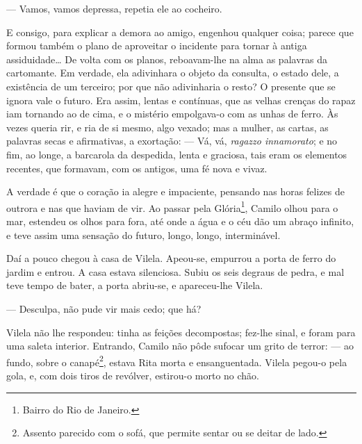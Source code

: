 --- Vamos, vamos depressa, repetia ele ao cocheiro.

E consigo, para explicar a demora ao amigo, engenhou qualquer coisa;
parece que formou também o plano de aproveitar o incidente para tornar à
antiga assiduidade\ldots{} De volta com os planos, reboavam-lhe na alma
as palavras da cartomante. Em verdade, ela adivinhara o objeto da
consulta, o estado dele, a existência de um terceiro; por que não
adivinharia o resto? O presente que se ignora vale o futuro. Era assim,
lentas e contínuas, que as velhas crenças do rapaz iam tornando ao de
cima, e o mistério empolgava-o com as unhas de ferro. Às vezes queria
rir, e ria de si mesmo, algo vexado; mas a mulher, as cartas, as
palavras secas e afirmativas, a exortação: --- Vá, vá, \emph{ragazzo
innamorato}; e no fim, ao longe, a barcarola da despedida, lenta e
graciosa, tais eram os elementos recentes, que formavam, com os antigos,
uma fé nova e vivaz.

A verdade é que o coração ia alegre e impaciente, pensando nas horas
felizes de outrora e nas que haviam de vir. Ao passar pela
Glória\footnote{Bairro do Rio de Janeiro.}, Camilo olhou para o mar,
estendeu os olhos para fora, até onde a água e o céu dão um abraço
infinito, e teve assim uma sensação do futuro, longo, longo,
interminável.

Daí a pouco chegou à casa de Vilela. Apeou-se, empurrou a porta de ferro
do jardim e entrou. A casa estava silenciosa. Subiu os seis degraus de
pedra, e mal teve tempo de bater, a porta abriu-se, e apareceu-lhe
Vilela.

--- Desculpa, não pude vir mais cedo; que há?

Vilela não lhe respondeu: tinha as feições decompostas; fez-lhe sinal, e
foram para uma saleta interior. Entrando, Camilo não pôde sufocar um
grito de terror: --- ao fundo, sobre o canapé\footnote{Assento parecido
  com o sofá, que permite sentar ou se deitar de lado.}, estava Rita
morta e ensanguentada. Vilela pegou-o pela gola, e, com dois tiros de
revólver, estirou-o morto no chão.
